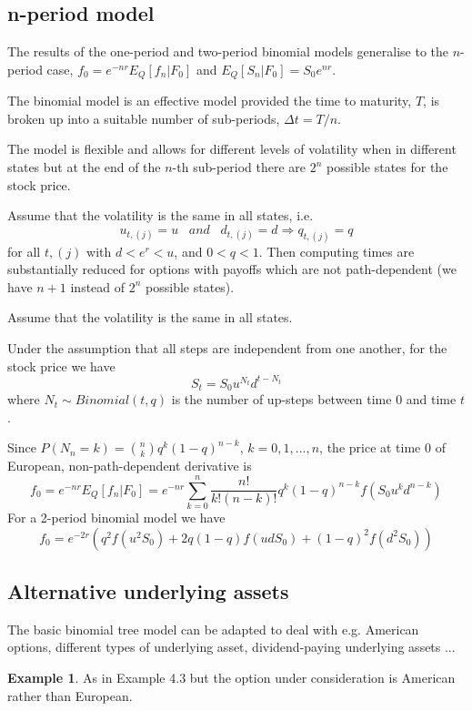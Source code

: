 \documentclass[11pt,a4paper]{book}
\theoremstyle{definition}\newtheorem{definition}{Definition}
\theoremstyle{definition}\newtheorem{fact}{Fact}
\theoremstyle{definition}\newtheorem{remark}{Remark}
\theoremstyle{definition}\newtheorem{ex}{Ex.}
\theoremstyle{definition}\newtheorem{project}{Project}
\theoremstyle{definition}\newtheorem{problem}{Problem}
\theoremstyle{definition}\newtheorem{example}{Example}
\numberwithin{theorem}{section}
\numberwithin{corollary}{chapter}
\numberwithin{assumption}{chapter}
\numberwithin{definition}{chapter}
\numberwithin{prop}{chapter}
\numberwithin{notation}{chapter}
\numberwithin{problem}{chapter}
\numberwithin{example}{chapter}
\numberwithin{fact}{chapter}
\numberwithin{ex}{chapter}
\begin{document}
\subsection{n-period model}

The results of the one-period and two-period binomial models generalise to the $n$-period case, $f_0 = e^{-nr} E_Q[f_n | F_0]$ and $E_Q[S_n | F_0] = S_0 e^{nr}$.

The binomial model is an effective model provided the time to maturity, $T$, is broken up into a suitable number of sub-periods, $\Delta t = T/n$.

The model is flexible and allows for different levels of volatility when in different states but at the end of the $n$-th sub-period there are $2^n$ possible states for the stock price.

Assume that the volatility is the same in all states, i.e. 
$$u_{t,(j)} = u \,\,\,\,\, and \,\,\,\,\, d_{t,(j)} = d \Longrightarrow q_{t,(j)} = q $$ 
for all $t,(j)$ with $d < e^r < u$, and $0<q<1$. Then computing times are substantially reduced for options with payoffs which are not path-dependent (we have $n+1$ instead of $2^n$ possible states).

Assume that the volatility is the same in all states.

Under the assumption that all steps are independent from one another, for the stock price we have
$$ S_t = S_0 u^{N_t} d^{t-N_t} $$
where $N_t \sim Binomial(t,q)$ is the number of up-steps between time 0 and time $t$.

Since $P(N_n = k) = \binom{n}{k} q^k (1-q)^{n-k}$, $k=0,1,...,n$, the price at time 0 of European, non-path-dependent derivative is
$$ f_0 = e^{-nr} E_Q[f_n|F_0] = e^{-nr}\sum_{k=0}^n \frac{n!}{k!(n-k)!} q^k(1-q)^{n-k} f(S_0u^kd^{n-k}) $$
For a 2-period binomial model we have
$$ f_0 = e^{-2r}(q^2f(u^2 S_0) + 2q(1-q)f(udS_0) + (1-q)^2 f(d^2S_0)) $$

\subsection{Alternative underlying assets}
The basic binomial tree model can be adapted to deal with e.g. American options, different types of underlying asset, dividend-paying underlying assets ...

\begin{example}
As in Example 4.3 but the option under consideration is American rather than European.
\end{example}
\end{document}
